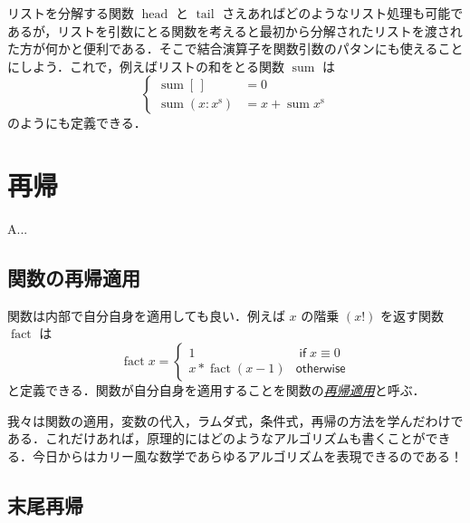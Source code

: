 \documentclass[a4paper,draft]{jsbook}
\newenvironment{leader}{\begingroup}{\endgroup}
\newcommand{\keyword}[1]{{\underline{\emph{#1}}}}
\newcommand{\mEmptyList}{{[\,]}}
\newcommand{\mList}[1]{{#1}^\mathrm{s}}
\DeclareMathOperator{\mSum}{sum}
\DeclareMathOperator{\mHead}{head}
\DeclareMathOperator{\mTail}{tail}
\DeclareMathOperator{\mathFactorial}{fact}
\newcommand{\mathKeyword}[1]{\operatorname{\textsf{#1}}}
\newcommand{\mathIf}{\mathKeyword{if}}
\newcommand{\mathOtherwise}{\mathKeyword{otherwise}}
\begin{document}
リストを分解する関数 $\mHead$ と $\mTail$ さえあればどのようなリスト処理も可能であるが，リストを引数にとる関数を考えると最初から分解されたリストを渡された方が何かと便利である．そこで結合演算子を関数引数のパタンにも使えることにしよう．これで，例えばリストの和をとる関数 $\mSum$ は
\begin{equation}
\left\{
\begin{split}
\mSum\mEmptyList&=0\\
\mSum(x:\mList{x})&=x+\mSum\mList{x}
\end{split}
\right.
\end{equation}
のようにも定義できる．




\chapter{再帰}

\begin{leader}
A...
\end{leader}


\section{関数の再帰適用}

関数は内部で自分自身を適用しても良い．例えば $x$ の階乗 $(x!)$ を返す関数 $\mathFactorial$ は
\begin{equation}
\mathFactorial x=\begin{cases}
1&\mathIf x\equiv0\\
x*\mathFactorial(x-1)&\mathOtherwise
\end{cases}
\end{equation}
と定義できる．関数が自分自身を適用することを関数の\keyword{再帰適用}と呼ぶ．

我々は関数の適用，変数の代入，ラムダ式，条件式，再帰の方法を学んだわけである．これだけあれば，原理的にはどのようなアルゴリズムも書くことができる．今日からはカリー風な数学であらゆるアルゴリズムを表現できるのである！

\section{末尾再帰}
\end{document}

